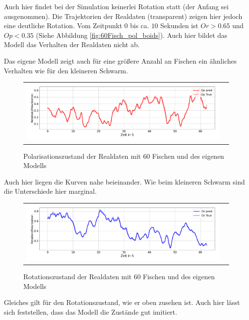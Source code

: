 Auch hier findet bei der Simulation keinerlei Rotation statt (der Anfang sei ausgenommen). Die Trajektorien der Realdaten (transparent) zeigen hier jedoch eine deutliche Rotation. Vom Zeitpunkt $0$ bis ca. $10$ Sekunden ist $Or > 0.65$ und $Op < 0.35$ (Siehe Abbildung \ref{fig:60Fisch_pol_boids}). Auch hier bildet das Modell das Verhalten der Realdaten nicht ab.

Das eigene Modell zeigt auch für eine größere Anzahl an Fischen ein ähnliches Verhalten wie für den kleineren Schwarm.

\begin{figure}[H]
\centering
\begin{tabular}{cc}
\includegraphics[width=1.0\textwidth]{figures/Experimente/Realdaten/PWD_60Fische_POL.png} 
\end{tabular}
\caption{Polarisationszustand der Realdaten mit 60 Fischen und des eigenen Modells\label{fig:60Fisch_pol_EIGEN}}
\end{figure}

Auch hier liegen die Kurven nahe beieinander. Wie beim kleineren Schwarm sind die Unterschiede hier marginal.

\begin{figure}[H]
\centering
\begin{tabular}{cc}
\includegraphics[width=1.0\textwidth]{figures/Experimente/Realdaten/PWD_60Fische_ROT.png} 
\end{tabular}
\caption{Rotationszustand der Realdaten mit 60 Fischen und des eigenen Modells\label{fig:60Fisch_rot_EIGEN}}
\end{figure}

Gleiches gilt für den Rotationszustand, wie er oben zusehen ist. Auch hier lässt sich feststellen, dass das Modell die Zustände gut imitiert.

